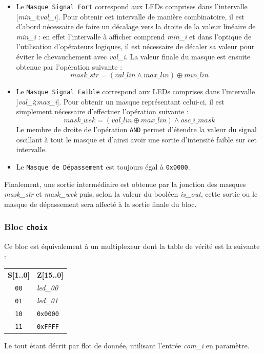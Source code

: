 \begin{itemize}

\item Le \texttt{Masque Signal Fort} correspond aux LEDs comprises dans l'intervalle [\textit{min\_i};\textit{val\_i}]. Pour obtenir cet intervalle de manière combinatoire, il est d'abord nécessaire de faire un décalage vers la droite de la valeur linéaire de \textit{min\_i} : en effet l'intervalle à afficher comprend \textit{min\_i} et dans l'optique de l'utilisation d'opérateurs logiques, il est nécessaire de décaler sa valeur pour éviter le chevauchement avec \textit{val\_i}. La valeur finale du masque est ensuite obtenue par l'opération suivante :
\begin{equation*}
 mask\_str = (val\_lin \land max\_lin) \oplus min\_lin
\end{equation*}

\item Le \texttt{Masque Signal Faible} correspond aux LEDs comprises dans l'intervalle ]\textit{val\_i};\textit{max\_i}]. Pour obtenir un masque représentant celui-ci, il est simplement nécessaire d'effectuer l'opération suivante :
\begin{equation*}
mask\_wek = (val\_lin \oplus max\_lin ) \land osc\_i\_mask
\end{equation*}
Le membre de droite de l'opération \texttt{AND} permet d'étendre la valeur du signal oscillant à tout le masque et d'ainsi avoir une sortie d'intensité faible sur cet intervalle.

\item Le \texttt{Masque de Dépassement} est toujours égal à \texttt{0x0000}.

\end{itemize}

Finalement, une sortie intermédiaire est obtenue par la jonction des masques \textit{mask\_str} et \textit{mask\_wek} puis, selon la valeur du booléen \textit{is\_out}, cette sortie ou le masque de dépassement sera affecté à la sortie finale du bloc.

\subsubsection{Bloc \texttt{choix}}

Ce bloc est équivalement à un multiplexeur dont la table de vérité est la suivante : 

\begin{center}

\begin{tabular}{c|l}
\textbf{S[1..0]} & \textbf{Z[15..0]} \\
\texttt{00} & \textit{led\_00} \\
\texttt{01} & \textit{led\_01} \\
\texttt{10} & \texttt{0x0000} \\
\texttt{11} & \texttt{0xFFFF} 
\end{tabular}

\end{center}
Le tout étant décrit par flot de donnée, utilisant l'entrée \textit{com\_i} en paramètre.

